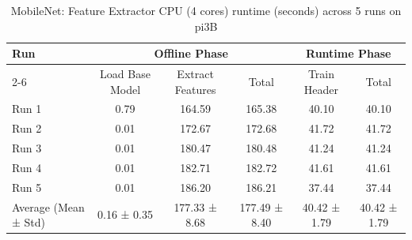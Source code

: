 \begin{table}[t]
\centering
\caption{MobileNet: Feature Extractor CPU (4 cores) runtime (seconds) across 5 runs on pi3B}
\label{tab:runtime_mobilenet_CPU4_pi3B}
\begin{tabular}{lccccc}
\hline
\multirow{2}{*}{Run} & \multicolumn{3}{c}{Offline Phase} & \multicolumn{2}{c}{Runtime Phase} \\
\cline{2-6}
 & Load Base Model & Extract Features & Total & Train Header & Total \\
\hline
  Run 1                  & 0.79           & 164.59         & 165.38         & 40.10          & 40.10          \\
  Run 2                  & 0.01           & 172.67         & 172.68         & 41.72          & 41.72          \\
  Run 3                  & 0.01           & 180.47         & 180.48         & 41.24          & 41.24          \\
  Run 4                  & 0.01           & 182.71         & 182.72         & 41.61          & 41.61          \\
  Run 5                  & 0.01           & 186.20         & 186.21         & 37.44          & 37.44          \\
\hline
  Average (Mean ± Std)   & 0.16 ± 0.35    & 177.33 ± 8.68  & 177.49 ± 8.40  & 40.42 ± 1.79   & 40.42 ± 1.79   \\
\hline
\end{tabular}
\end{table}
